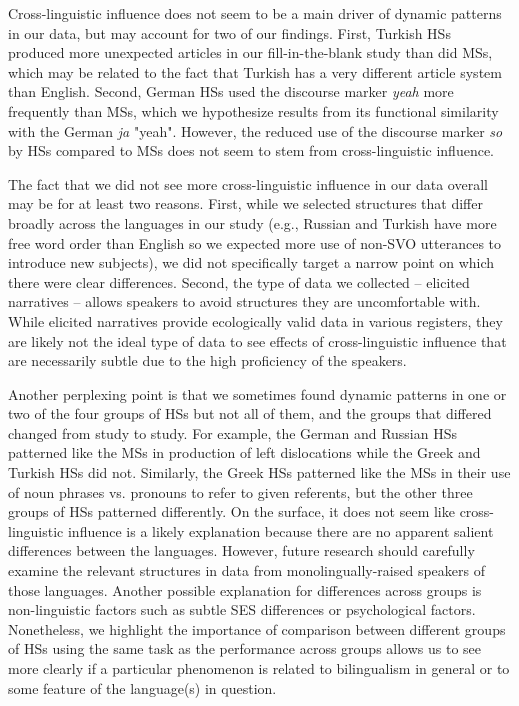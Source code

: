 \documentclass[output=paper,colorlinks,citecolor=brown]{langscibook}
\begin{document}
Cross-linguistic influence does not seem to be a main driver of dynamic patterns in our data, but may account for two of our findings. First, Turkish HSs produced more unexpected articles in our fill-in-the-blank study than did MSs, which may be related to the fact that Turkish has a very different article system than English. Second, German HSs used the discourse marker \textit{yeah} more frequently than MSs, which we hypothesize results from its functional similarity with the German \textit{ja} "yeah". However, the reduced use of the discourse marker \textit{so} by HSs compared to MSs does not seem to stem from cross-linguistic influence.

The fact that we did not see more cross-linguistic influence in our data overall may be for at least two reasons. First, while we selected structures that differ broadly across the languages in our study (e.g., Russian and Turkish have more free word order than English so we expected more use of non-SVO utterances to introduce new subjects), we did not specifically target a narrow point on which there were clear differences. Second, the type of data we collected -- elicited narratives -- allows speakers to avoid structures they are uncomfortable with. While elicited narratives provide ecologically valid data in various registers, they are likely not the ideal type of data to see effects of cross-linguistic influence that are necessarily subtle due to the high proficiency of the speakers.

Another perplexing point is that we sometimes found dynamic patterns in one or two of the four groups of HSs but not all of them, and the groups that differed changed from study to study. For example, the German and Russian HSs patterned like the MSs in production of left dislocations while the Greek and Turkish HSs did not. Similarly, the Greek HSs patterned like the MSs in their use of noun phrases vs. pronouns to refer to given referents, but the other three groups of HSs patterned differently. On the surface, it does not seem like cross-linguistic influence is a likely explanation because there are no apparent salient differences between the languages. However, future research should carefully examine the relevant structures in data from monolingually-raised speakers of those languages. Another possible explanation for differences across groups is non-linguistic factors such as subtle SES differences or psychological factors. Nonetheless, we highlight the importance of comparison between different groups of HSs using the same task as the performance across groups allows us to see more clearly if a particular phenomenon is related to bilingualism in general or to some feature of the language(s) in question.
\end{document}
